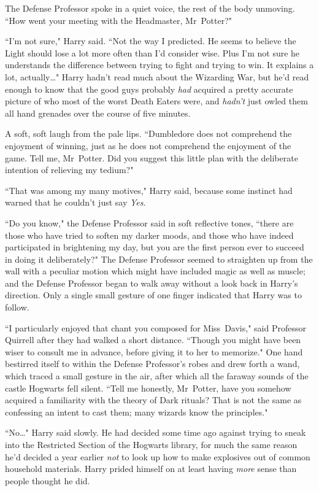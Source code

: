 The Defense Professor spoke in a quiet voice, the rest of the body unmoving. ``How went your meeting with the Headmaster, Mr~Potter?"

``I'm not sure," Harry said. ``Not the way I predicted. He seems to believe the Light should lose a lot more often than I'd consider wise. Plus I'm not sure he understands the difference between trying to fight and trying to win. It explains a lot, actually{\ldots}" Harry hadn't read much about the Wizarding War, but he'd read enough to know that the good guys probably \emph{had} acquired a pretty accurate picture of who most of the worst Death Eaters were, and \emph{hadn't} just owled them all hand grenades over the course of five minutes.

A soft, soft laugh from the pale lips. ``Dumbledore does not comprehend the enjoyment of winning, just as he does not comprehend the enjoyment of the game. Tell me, Mr~Potter. Did you suggest this little plan with the deliberate intention of relieving my tedium?"

``That was among my many motives," Harry said, because some instinct had warned that he couldn't just say \emph{Yes}.

``Do you know," the Defense Professor said in soft reflective tones, ``there are those who have tried to soften my darker moods, and those who have indeed participated in brightening my day, but you are the first person ever to succeed in doing it deliberately?" The Defense Professor seemed to straighten up from the wall with a peculiar motion which might have included magic as well as muscle; and the Defense Professor began to walk away without a look back in Harry's direction. Only a single small gesture of one finger indicated that Harry was to follow.

``I particularly enjoyed that chant you composed for Miss~Davis," said Professor Quirrell after they had walked a short distance. ``Though you might have been wiser to consult me in advance, before giving it to her to memorize." One hand bestirred itself to within the Defense Professor's robes and drew forth a wand, which traced a small gesture in the air, after which all the faraway sounds of the castle Hogwarts fell silent. ``Tell me honestly, Mr~Potter, have you somehow acquired a familiarity with the theory of Dark rituals? That is not the same as confessing an intent to cast them; many wizards know the principles."

``No{\ldots}" Harry said slowly. He had decided some time ago against trying to sneak into the Restricted Section of the Hogwarts library, for much the same reason he'd decided a year earlier \emph{not} to look up how to make explosives out of common household materials. Harry prided himself on at least having \emph{more} sense than people thought he did.

